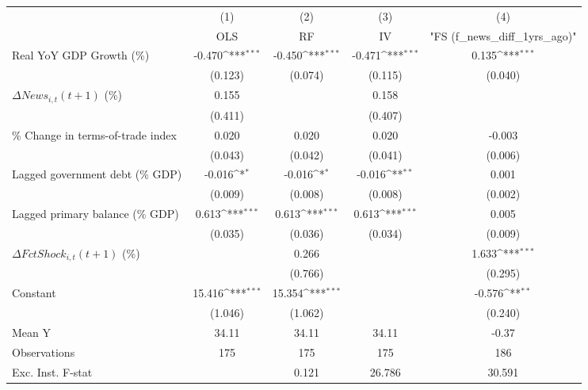 {
\def\sym#1{\ifmmode^{#1}\else\(^{#1}\)\fi}
\begin{tabular}{l*{4}{c}}
\toprule
                    &\multicolumn{1}{c}{(1)}&\multicolumn{1}{c}{(2)}&\multicolumn{1}{c}{(3)}&\multicolumn{1}{c}{(4)}\\
                    &\multicolumn{1}{c}{OLS}&\multicolumn{1}{c}{RF}&\multicolumn{1}{c}{IV}&\multicolumn{1}{c}{ "FS (f_news_diff_1yrs_ago)" }\\
\midrule
Real YoY GDP Growth (\%)&      -0.470\sym{***}&      -0.450\sym{***}&      -0.471\sym{***}&       0.135\sym{***}\\
                    &     (0.123)         &     (0.074)         &     (0.115)         &     (0.040)         \\
\addlinespace
$ \Delta News_{i,t}(t+1)$ (\%)&       0.155         &                     &       0.158         &                     \\
                    &     (0.411)         &                     &     (0.407)         &                     \\
\addlinespace
\% Change in terms-of-trade index&       0.020         &       0.020         &       0.020         &      -0.003         \\
                    &     (0.043)         &     (0.042)         &     (0.041)         &     (0.006)         \\
\addlinespace
Lagged government debt (\% GDP)&      -0.016\sym{*}  &      -0.016\sym{*}  &      -0.016\sym{**} &       0.001         \\
                    &     (0.009)         &     (0.008)         &     (0.008)         &     (0.002)         \\
\addlinespace
Lagged primary balance (\% GDP)&       0.613\sym{***}&       0.613\sym{***}&       0.613\sym{***}&       0.005         \\
                    &     (0.035)         &     (0.036)         &     (0.034)         &     (0.009)         \\
\addlinespace
$ \Delta FctShock_{i,t}(t+1)$ (\%)&                     &       0.266         &                     &       1.633\sym{***}\\
                    &                     &     (0.766)         &                     &     (0.295)         \\
\addlinespace
Constant            &      15.416\sym{***}&      15.354\sym{***}&                     &      -0.576\sym{**} \\
                    &     (1.046)         &     (1.062)         &                     &     (0.240)         \\
\midrule
Mean Y              &       34.11         &       34.11         &       34.11         &       -0.37         \\
Observations        &         175         &         175         &         175         &         186         \\
Exc. Inst. F-stat   &                     &       0.121         &      26.786         &      30.591         \\
\bottomrule
\end{tabular}
}

